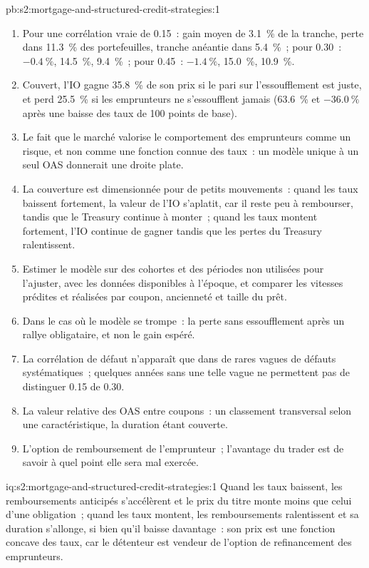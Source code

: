 \begin{solution}{pb:s2:mortgage-and-structured-credit-strategies:1}
\begin{enumerate}
des obligations catastrophe économiques, pour une rémunération inférieure à celle d'alternatives comparables.
\item Pour une corrélation vraie de 0.15~: gain moyen de 3.1~\% de la tranche, perte dans 11.3~\% des portefeuilles, tranche anéantie dans 5.4~\%~; pour 0.30~: $-0.4~\%$, 14.5~\%,
9.4~\%~; pour 0.45~: $-1.4~\%$, 15.0~\%, 10.9~\%.
\item Couvert, l'IO gagne 35.8~\% de son prix si le pari sur l'essoufflement est juste, et perd 25.5~\% si les emprunteurs ne s'essoufflent jamais (63.6~\% et $-36.0~\%$ après
une baisse des taux de 100 points de base).
\item Le fait que le marché valorise le comportement des emprunteurs comme un risque, et non comme une fonction connue des taux~: un modèle unique à un seul OAS donnerait une droite plate.
\item La couverture est dimensionnée pour de petits mouvements~: quand les taux baissent fortement, la valeur de l'IO s'aplatit, car il reste peu à rembourser, tandis que le Treasury continue
à monter~; quand les taux montent fortement, l'IO continue de gagner tandis que les pertes du Treasury ralentissent.
\item Estimer le modèle sur des cohortes et des périodes non utilisées pour l'ajuster, avec les données disponibles à l'époque, et comparer les vitesses prédites et réalisées par
coupon, ancienneté et taille du prêt.
\item Dans le cas où le modèle se trompe~: la perte sans essoufflement après un rallye obligataire, et non le gain espéré.
\item La corrélation de défaut n'apparaît que dans de rares vagues de défauts systématiques~; quelques années sans une telle vague ne permettent pas de distinguer 0.15 de 0.30.
\item La valeur relative des OAS entre coupons~: un classement transversal selon une caractéristique, la duration étant couverte.
\item L'option de remboursement de l'emprunteur~; l'avantage du trader est de savoir à quel point elle sera mal exercée.
\end{enumerate}
\end{solution}

\begin{solution}{iq:s2:mortgage-and-structured-credit-strategies:1}
Quand les taux baissent, les remboursements anticipés s'accélèrent et le prix du titre monte moins que celui d'une obligation~; quand les taux montent, les remboursements ralentissent et sa duration s'allonge,
si bien qu'il baisse davantage~: son prix est une fonction concave des taux, car le détenteur est vendeur de l'option de refinancement des emprunteurs.
\end{solution}

